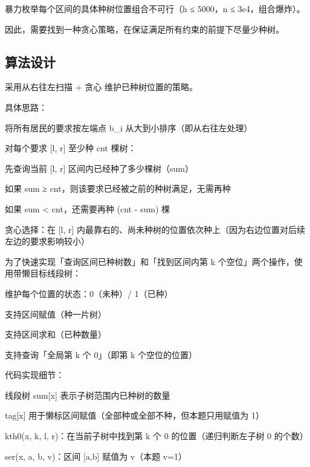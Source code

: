 \documentclass[supercite]{Experimental_Report}
\theoremstyle{definition}
\begin{document}
	暴力枚举每个区间的具体种树位置组合不可行（h ≤ 5000，n ≤ 3e4，组合爆炸）。
	
	因此，需要找到一种贪心策略，在保证满足所有约束的前提下尽量少种树。
	
	\subsection{算法设计}
	采用从右往左扫描 + 贪心 维护已种树位置的策略。
	
	具体思路：
	
	将所有居民的要求按左端点 b\_i 从大到小排序（即从右往左处理）
	
	对每个要求 [l, r] 至少种 cnt 棵树：
	
	先查询当前 [l, r] 区间内已经种了多少棵树（sum）
	
	如果 sum ≥ cnt，则该要求已经被之前的种树满足，无需再种
	
	如果 sum < cnt，还需要再种 (cnt - sum) 棵
	
	贪心选择：在 [l, r] 内最靠右的、尚未种树的位置依次种上（因为右边位置对后续左边的要求影响较小）
	
	为了快速实现「查询区间已种树数」和「找到区间内第 k 个空位」两个操作，使用带懒目标线段树：
	
	维护每个位置的状态：0（未种）/ 1（已种）
	
	支持区间赋值（种一片树）
	
	支持区间求和（已种数量）
	
	支持查询「全局第 k 个 0」（即第 k 个空位的位置）
	
	代码实现细节：
	
	线段树 sum[x] 表示子树范围内已种树的数量
	
	tag[x] 用于懒标区间赋值（全部种或全部不种，但本题只用赋值为 1）
	
	kth0(x, k, l, r)：在当前子树中找到第 k 个 0 的位置（递归判断左子树 0 的个数）
	
	ser(x, a, b, v)：区间 [a,b] 赋值为 v（本题 v=1）
	
\end{document}
